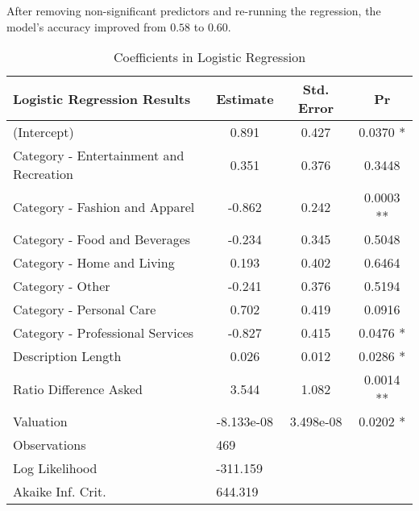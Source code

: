 \documentclass{article}
\begin{document}
After removing non-significant predictors and re-running the regression, the model's accuracy improved from $0.58$ to $0.60$.

\begin{table}[H]
    \centering
    \begin{tabular}{lccc}
        \hline
        \textbf{Logistic Regression Results} & \textbf{Estimate} & \textbf{Std. Error} & \textbf{Pr} \\ \hline
        (Intercept)                         & 0.891             & 0.427               & 0.0370 * \\
        Category - Entertainment and Recreation & 0.351             & 0.376               & 0.3448   \\
        Category - Fashion and Apparel     & -0.862            & 0.242               & 0.0003 ** \\
        Category - Food and Beverages      & -0.234            & 0.345               & 0.5048   \\
        Category - Home and Living         & 0.193             & 0.402               & 0.6464   \\
        Category - Other                   & -0.241            & 0.376               & 0.5194   \\
        Category - Personal Care           & 0.702             & 0.419               & 0.0916   \\
        Category - Professional Services   & -0.827            & 0.415               & 0.0476 * \\
        Description Length                 & 0.026             & 0.012               & 0.0286 * \\
        Ratio Difference Asked             & 3.544             & 1.082               & 0.0014 ** \\
        Valuation                          & -8.133e-08        & 3.498e-08           & 0.0202 * \\ \hline
        Observations                       & \multicolumn{3}{l}{469} \\
        Log Likelihood                     & \multicolumn{3}{l}{-311.159} \\
        Akaike Inf. Crit.                  & \multicolumn{3}{l}{644.319} \\ \hline
    \end{tabular}
    \caption{Coefficients in Logistic Regression}
    \label{tab:logistic_regression}
    \begin{flushleft}
    \end{flushleft}
\end{table}
\end{document}
